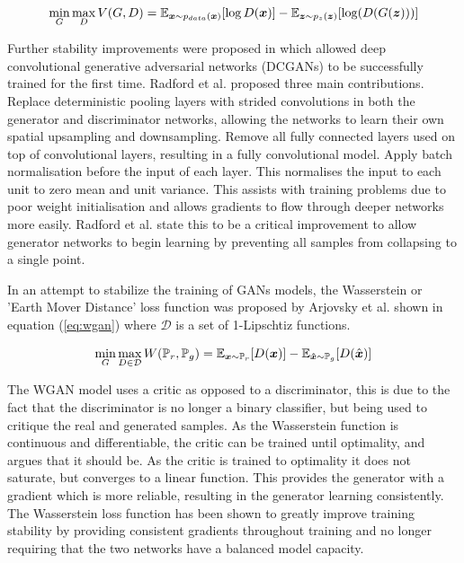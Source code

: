 \documentclass[12pt]{article}
\begin{document}
\begin{equation} \label{eq:gans_loss2}
    \min_{G} \max_{D} V(G, D) = \mathbb{E}_{{\boldsymbol{{x}}} \sim p_{data}({\boldsymbol{{x}}})} [\log D({\boldsymbol{{x}}})]
                              - \mathbb{E}_{{\boldsymbol{{z}}} \sim p_{z}({\boldsymbol{{z}}})} [\log (D(G({\boldsymbol{{z}}})))]
\end{equation}
\quad

Further stability improvements were proposed in \cite{Radford2016} which allowed deep convolutional generative adversarial networks (DCGANs) to be successfully trained for the first time.
Radford et al. proposed three main contributions.
Replace deterministic pooling layers with strided convolutions in both the generator and discriminator networks, allowing the networks to learn their own spatial upsampling and downsampling.
Remove all fully connected layers used on top of convolutional layers, resulting in a fully convolutional model.
Apply batch normalisation \cite{Ioffe2015} before the input of each layer.
This normalises the input to each unit to zero mean and unit variance.
This assists with training problems due to poor weight initialisation and allows gradients to flow through deeper networks more easily.
Radford et al. state this to be a critical improvement to allow generator networks to begin learning by preventing all samples from collapsing to a single point. 

In an attempt to stabilize the training of GANs models, the Wasserstein or 'Earth Mover Distance' loss function was proposed by Arjovsky et al. \cite{Arjovsky2017} shown in equation (\ref{eq:wgan}) where $\mathcal{D}$ is a set of 1-Lipschtiz functions.

\begin{equation} \label{eq:wgan}
    \min_{G} \max_{D \in \mathcal{D}} W(\mathbb{P}_{r}, \mathbb{P}_{g}) =
            \mathbb{E}_{{\boldsymbol{{x}}} \sim \mathbb{P}_{r}} [D({\boldsymbol{{x}}})]
            -\mathbb{E}_{{\boldsymbol{{\hat{x}}}} \sim \mathbb{P}_{g}} [D(\hat{{\boldsymbol{{x}}}})]
\end{equation}
\quad

\noindent The WGAN model uses a critic as opposed to a discriminator, this is due to the fact that the discriminator is no longer a binary classifier, but being used to critique the real and generated samples. 
As the Wasserstein function is continuous and differentiable, the critic can be trained until optimality, and \cite{Arjovsky2017} argues that it should be.
As the critic is trained to optimality it does not saturate, but converges to a linear function.
This provides the generator with a gradient which is more reliable, resulting in the generator learning consistently.
The Wasserstein loss function has been shown to greatly improve training stability by providing consistent gradients throughout training and no longer requiring that the two networks have a balanced model capacity.
\end{document}
